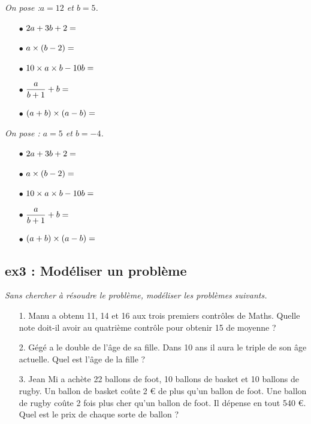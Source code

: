 \documentclass[11pt]{article}
\newcommand{\Pointilles}[1][3]{%
  \multido{}{#1}{\makebox[\linewidth]{\dotfill}\\[\parskip]
}}
\begin{document}
\begin{multicols}{2}
\textit{On pose :$a = 12$ et $b = 5$. }

\begin{itemize}
  \item[$\bullet$] $2a + 3b + 2 = \dotfill$
  \item[$\bullet$] $a \times (b - 2) = \dotfill$
  \item[$\bullet$] $10 \times a \times b - 10b = \dotfill$
  \item[$\bullet$] $\dfrac{a}{b + 1} + b = \dotfill$
  \item[$\bullet$] $(a + b) \times (a - b) = \dotfill$
\end{itemize}

\columnbreak

\textit{On pose : $a = 5$ et $b = -4$.}

\begin{itemize}
  \item[$\bullet$] $2a + 3b + 2 = \dotfill$
  \item[$\bullet$] $a \times (b - 2) = \dotfill$
  \item[$\bullet$] $10 \times a \times b - 10b = \dotfill$
  \item[$\bullet$] $\dfrac{a}{b + 1} + b = \dotfill$
  \item[$\bullet$] $(a + b) \times (a - b) = \dotfill$     
\end{itemize}
\end{multicols}
\subsection*{ex3 : Modéliser un problème}
\textit{Sans chercher à résoudre le problème, modéliser les problèmes suivants.}

\begin{multicols}{2}
\begin{enumerate}
  \item[1.] Manu a obtenu 11, 14 et 16 aux trois premiers contrôles de Maths. Quelle note doit-il avoir au quatrième contrôle pour obtenir 15 de moyenne ?
  \item[2.] Gégé a le double de l’âge de sa fille. Dans 10 ans il aura le triple de son âge actuelle. Quel est l’âge de la fille ?
  \item[3.] Jean Mi a achète 22 ballons de foot, 10 ballons de basket et 10 ballons de rugby. Un ballon de basket coûte 2 € de plus qu’un ballon de foot. Une ballon de rugby coûte 2 fois plus cher qu'un ballon de foot.  Il dépense en tout 540 €. Quel est le prix de chaque sorte de ballon ?
\end{enumerate}
\columnbreak
\Pointilles[24] 
\end{multicols}
\newpage
\end{document}
